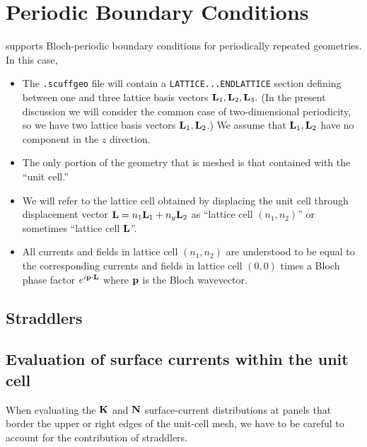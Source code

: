 \newpage
\section{Periodic Boundary Conditions}

\lss supports Bloch-periodic boundary conditions for
periodically repeated geometries. In this case,

\begin{itemize}
 \item The \texttt{.scuffgeo} file will contain
       a \texttt{LATTICE...ENDLATTICE} section defining 
       between one and three lattice basis vectors 
       $\mathbf{L}_1, \mathbf{L}_2, \mathbf{L}_3.$ (In the present 
       discussion we will consider the common case
       of two-dimensional periodicity, so we have two
       lattice basis vectors $\mathbf{L}_1, \mathbf{L}_2$.) 
       We assume that $\mathbf{L}_1, \mathbf{L}_2$ have no 
       component in the $z$ direction.
 \item The only portion of the geometry that is
       meshed is that contained with the ``unit cell.''
 \item We will refer to the lattice cell obtained by 
       displacing the unit cell through displacement 
       vector $\mathbf{L}=n_1 \mathbf{L}_1 + n_y \mathbf{L}_2$ as 
       ``lattice cell $(n_1, n_2)$'' or sometimes
       ``lattice cell $\mathbf{L}$''.
 \item All currents and fields in lattice cell $(n_1,n_2)$
       are understood to be equal to the corresponding
       currents and fields in lattice cell $(0,0)$ times
       a Bloch phase factor $e^{i\mathbf{p}\cdot \mathbf{L}}$ where
       $\mathbf{p}$ is the Bloch wavevector.
\end{itemize}

\subsection{Straddlers}

\subsection{Evaluation of surface currents within the unit cell}

When evaluating the $\mathbf{K}$ and $\mathbf{N}$ surface-current 
distributions at panels that border the upper or right edges 
of the unit-cell mesh, we have to be careful to account for the 
contribution of straddlers. 

